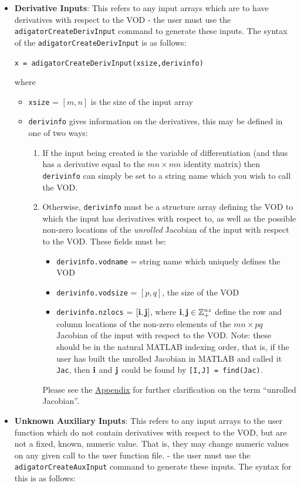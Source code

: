 \documentclass[10pt,pdftex]{article}
\begin{document}
\begin{itemize}


\item {\bf Derivative Inputs}: This refers to any input arrays which are to have derivatives with respect to the VOD - the user must use the \texttt{adigatorCreateDerivInput} command to generate these inputs. The syntax of the \texttt{adigatorCreateDerivInput} is as follows:\\
\centerline{\texttt{x = adigatorCreateDerivInput(xsize,derivinfo)}}
where
\begin{itemize}
\item \texttt{xsize} = $[m,n]$ is the size of the input array
\item \texttt{derivinfo} gives information on the derivatives, this may be defined in one of two ways:\\
\begin{enumerate}
\item If the input being created is the variable of differentiation (and thus has a derivative equal to the $mn \times mn$ identity matrix) then \texttt{derivinfo} can simply be set to a string name which you wish to call the VOD.
\item Otherwise, \texttt{derivinfo} must be a structure array defining the VOD to which the input has derivatives with respect to, as well as the possible non-zero locations of the \emph{unrolled} Jacobian of the input with respect to the VOD. These fields must be:
\begin{itemize}
\item \texttt{derivinfo.vodname} = string name which uniquely defines the VOD
\item \texttt{derivinfo.vodsize} = $[p,q]$, the size of the VOD
\item \texttt{derivinfo.nzlocs} = $[\mathbf{i},\mathbf{j}]$, where $\mathbf{i},\mathbf{j} \in \mathbb{Z}_+^{nz}$ define the row and column locations of the non-zero elements of the $mn \times pq$ Jacobian of the input with respect to the VOD. Note: these should be in the natural MATLAB indexing order, that is, if the user has built the unrolled Jacobian in MATLAB and called it \texttt{Jac}, then $\mathbf{i}$ and $\mathbf{j}$ could be found by \texttt{[I,J] = find(Jac)}. 
\end{itemize}
Please see the \hyperlink{Appendix}{Appendix} for further clarification on the term ``unrolled Jacobian''.
\end{enumerate}
\end{itemize}
\item {\bf Unknown Auxiliary Inputs}: This refers to any input arrays to the user function which do not contain derivatives with respect to the VOD, but are not a fixed, known, numeric value. That is, they may change numeric values on any given call to the user function file. - the user must use the \texttt{adigatorCreateAuxInput} command to generate these inputs. The syntax for this is as follows:\\

\end{itemize}
\end{document}

